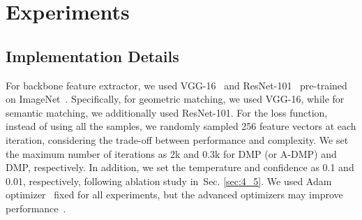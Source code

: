 \documentclass[10pt,twocolumn,letterpaper]{article}
\newcommand{\secref}[1]{Sec. \ref{#1}}
\begin{document}
\section{Experiments}
\subsection{Implementation Details}\label{sec:4_1}
For backbone feature extractor, we used VGG-16~\cite{simonyan2014very} and ResNet-101~\cite{he2016deep} pre-trained on ImageNet~\cite{deng2009imagenet}. Specifically, for geometric matching, we used VGG-16, while for semantic matching, we additionally used ResNet-101. 
For the loss function, instead of using all the samples, we randomly sampled  256 feature vectors at each iteration, considering the trade-off between performance and complexity. We set the maximum number of iterations as 2k and 0.3k for DMP (or A-DMP) and DMP, respectively. In addition, we set the temperature  and confidence  as 0.1 and 0.01, respectively, following ablation study in~\secref{sec:4_5}. We used Adam optimizer~\cite{kingma2014adam} fixed for all experiments, but the advanced optimizers may improve performance~\cite{reddi2019convergence,liu2019variance}. 
\end{document}
